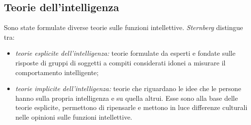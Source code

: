 \documentclass[a4paper]{article}
\begin{document}
\subsection{Teorie dell'intelligenza}
Sono state formulate diverse teorie sulle funzioni intellettive.
\emph{Sternberg} distingue tra:
\begin{itemize}
    \item \emph{teorie esplicite dell'intelligenza:} teorie formulate da esperti e fondate sulle risposte di gruppi di soggetti a compiti considerati idonei a misurare il comportamento intelligente;
    \item \emph{teorie implicite dell'intelligenza:} teorie che riguardano le idee che le persone hanno sulla propria intelligenza e su quella altrui. Esse sono alla base delle teorie esplicite, permettono di ripensarle e mettono in luce differenze culturali nelle opinioni sulle funzioni intellettive.
\end{itemize}
\end{document}
